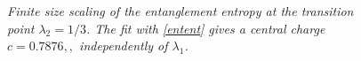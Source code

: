 \documentclass[aps,pra,superscriptaddress]{revtex4}
\renewcommand{\(}{\left(}
\renewcommand{\)}{\right)}
\renewcommand{\[}{\left[}
\renewcommand{\]}{\right]}
\begin{document}
\begin{figure}[H]
\center
{}
\caption{{\em Finite size scaling of the entanglement entropy at the transition point $\lambda_2 = 1/3$. The fit with \eqref{entent} gives a central charge $c=0.7876,,$ independently of $\lambda_1$. }}
\label{ee3}
\end{figure}
\end{document}
